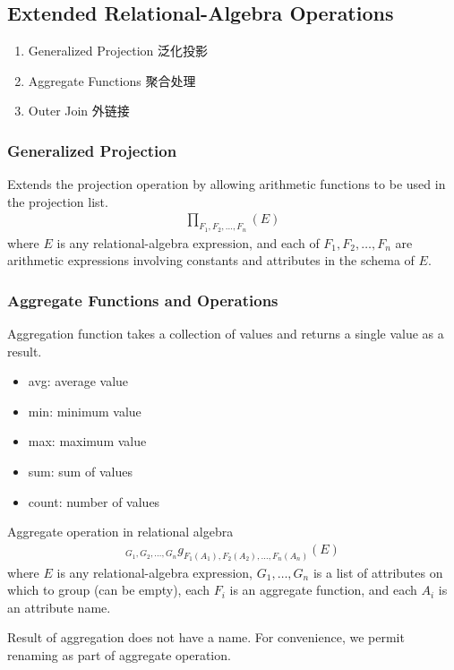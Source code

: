 \subsection{Extended Relational-Algebra Operations}
\begin{enumerate}
    \item Generalized Projection 泛化投影
    \item Aggregate Functions 聚合处理
    \item Outer Join 外链接
\end{enumerate}

\subsubsection{Generalized Projection}
Extends the projection operation by allowing arithmetic functions to be used in the projection list.
\begin{align*}
    \prod_{F_1,F_2,\dots,F_n}(E)
\end{align*}
where $E$ is any relational-algebra expression, and each of $F_1,F_2,\dots,F_n$ are arithmetic expressions involving constants and attributes in
the schema of $E$.

\subsubsection{Aggregate Functions and Operations}
Aggregation function takes a collection of values and returns a single value as a result.
\begin{itemize}
    \item avg: average value
    \item min: minimum value
    \item max: maximum value
    \item sum: sum of values
    \item count: number of values
\end{itemize}

Aggregate operation in relational algebra
\begin{align*}
    {}_{G_1,G_2,\dots,G_n}g_{F_1(A_1),F_2(A_2),\dots,F_n(A_n)}(E)
\end{align*}
where $E$ is any relational-algebra expression, $G_1,\dots,G_n$ is a list of attributes on which to group (can be empty), each $F_i$ is an aggregate function, and each $A_i$ is an attribute name.

Result of aggregation does not have a name. For convenience, we permit renaming as part of aggregate operation. 

